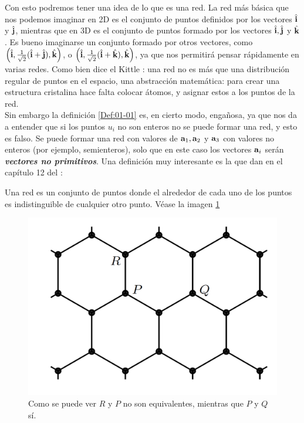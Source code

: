 Con esto podremos tener una idea de lo que es una red. La red más básica que nos podemos imaginar en 2D es el conjunto de puntos definidos por los vectores $\hat{\mathbf{i}}$ y $\hat{\mathbf{j}}$, mientras que en 3D es el conjunto de puntos formado por los vectores $\hat{\mathbf{i}},\hat{\mathbf{j}}$ y $\hat{\mathbf{k}}$. Es bueno imaginarse un conjunto formado por otros vectores, como $\left( \hat{\mathbf{i}},\frac{1}{\sqrt{2}} (\hat{\mathbf{i}} +\hat{\mathbf{j}}),\hat{\mathbf{k}} \right)$, o $\left( \hat{\mathbf{i}},\frac{1}{\sqrt{2}} (\hat{\mathbf{i}} +\hat{\mathbf{k}}),\hat{\mathbf{k}} \right)$, ya que nos permitirá pensar rápidamente en varias redes. Como bien dice el Kittle \cite{Estado_Solido_Kittel}:  una red no es más que una distribución regular de puntos en el espacio, una abstracción matemática: para crear una estructura cristalina hace falta colocar átomos, y asignar estos a los puntos de la red. \\

Sin embargo la definición \ref{Def:01-01} es, en cierto modo, engañosa, ya que nos da a entender que si los puntos $u_i$ no son enteros no se puede formar una red, y esto es falso. Se puede formar una red con valores de $\mathbf{a}_1,\mathbf{a}_2$ y $\mathbf{a}_3$ con valores no enteros (por ejemplo, semienteros), solo que en este caso los vectores $\mathbf{a}_i$ serán \textit{\textbf{vectores no primitivos}}. Una definición muy interesante es la que dan en el capítulo 12 del \cite{Oxford_Solid_State}:

\begin{definition_equivalente}
	Una red es un conjunto de puntos donde el alrededor de cada uno de los puntos es indistinguible de cualquier otro punto. Véase la imagen \ref{Fig:01-00}
\end{definition_equivalente}

\begin{figure}[h!] \centering
	\includegraphics[scale=0.3]{Cuerpo/Ch_01/red.png}
	\caption{Como se puede ver $R$ y $P$ no son equivalentes, mientras que $P$ y $Q$ sí.}
	\label{Fig:01-00}
\end{figure}


